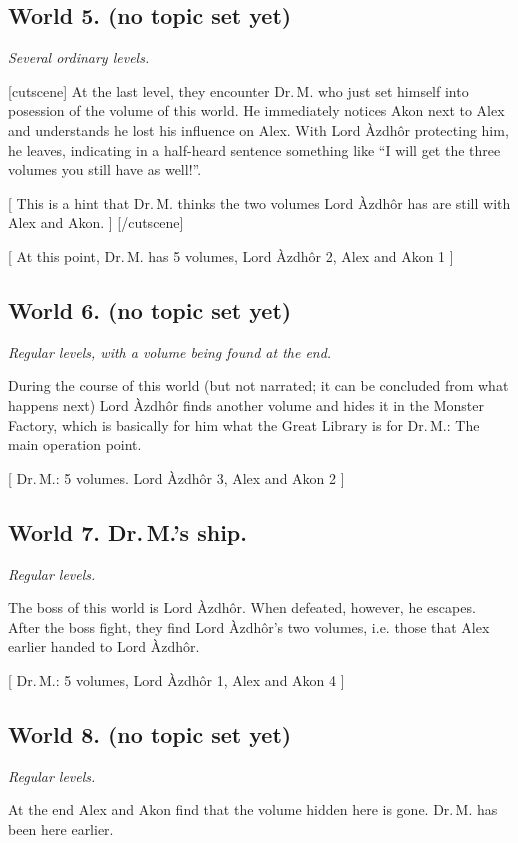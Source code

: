 \documentclass{gd-document}
\newcommand\DrM{Dr.\,M.\xspace}
\newcommand\Azdhor{Lord Àzdhôr\xspace}
\newcommand\level[1]{\textit{#1}}
\begin{document}
\subsection{World 5. (no topic set yet)}

\level{Several ordinary levels.}

[cutscene]
At the last level, they encounter \DrM who just set himself into
posession of the volume of this world. He immediately notices Akon
next to Alex and understands he lost his influence on Alex. With
\Azdhor protecting him, he leaves, indicating in a half-heard sentence
something like “I will get the three volumes you still have as
well!”.

[ This is a hint that \DrM thinks the two volumes \Azdhor has are
still with Alex and Akon. ]
[/cutscene]

[ At this point, \DrM has 5 volumes, \Azdhor 2, Alex and Akon 1 ]

\subsection{World 6. (no topic set yet)}

\level{Regular levels, with a volume being found at the end.}

During the course of this world (but not narrated; it can be concluded
from what happens next) \Azdhor finds another volume and hides it in
the Monster Factory, which is basically for him what the Great Library
is for \DrM: The main operation point.

[ \DrM: 5 volumes. \Azdhor 3, Alex and Akon 2 ]

\subsection{World 7. \DrM’s ship.}

\level{Regular levels.}

The boss of this world is \Azdhor. When defeated, however, he
escapes. After the boss fight, they find \Azdhor’s two volumes,
i.e. those that Alex earlier handed to \Azdhor.

[ \DrM: 5 volumes, \Azdhor 1, Alex and Akon 4 ]

\subsection{World 8. (no topic set yet)}

\level{Regular levels.}

At the end Alex and Akon find that the volume hidden here is
gone. \DrM has been here earlier.
\end{document}
